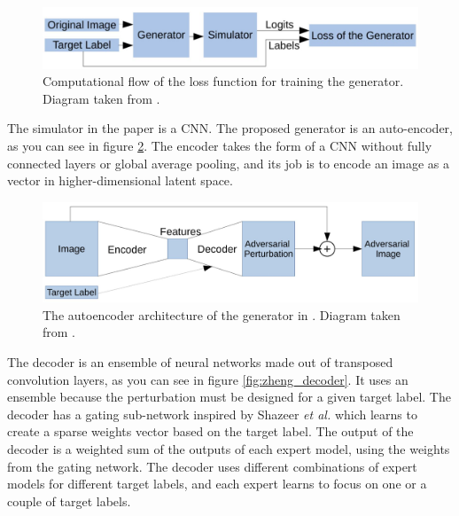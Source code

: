 \begin{figure}[h]
    \centering
    \includegraphics[width=1\textwidth]{graphics/generator_loss.JPG}
    \caption{Computational flow of the loss function for training the generator. Diagram taken from \cite{zheng_black_box_GAN}.}
    \label{fig:zheng_generator_loss}
\end{figure}

The simulator in the paper is a CNN. The proposed generator is an auto-encoder, as you can see in figure \ref{fig:zheng_generator}. The encoder takes the form of a CNN without fully connected layers or global average pooling, and its job is to encode an image as a vector in higher-dimensional latent space. 

\begin{figure}[h]
    \centering
    \includegraphics[width=1\textwidth]{graphics/generator.JPG}
    \caption{The autoencoder architecture of the generator in \cite{zheng_black_box_GAN}. Diagram taken from \cite{zheng_black_box_GAN}.}
    \label{fig:zheng_generator}
\end{figure}

The decoder is an ensemble of neural networks made out of transposed convolution layers, as you can see in figure \ref{fig:zheng_decoder}. It uses an ensemble because the perturbation must be designed for a given target label. The decoder has a gating sub-network inspired by Shazeer \textit{et al.} \cite{experts_mixture_gate} which learns to create a sparse weights vector based on the target label. The output of the decoder is a weighted sum of the outputs of each expert model, using the weights from the gating network. The decoder uses different combinations of expert models for different target labels, and each expert learns to focus on one or a couple of target labels.

